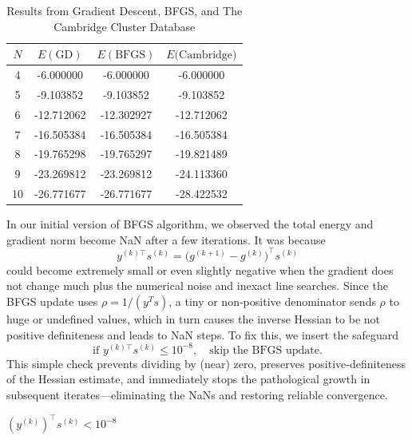 \documentclass[11pt,onecolumn]{article}
\begin{document}
\begin{table}[h]
\centering
\begin{tabular}{|c|c|c|c|}
\hline
\(N\) & \(E(\mathrm{GD})\) & \(E(\mathrm{BFGS})\) & \(E(\mathrm{Cambridge)}\) \\ \hline
4  & -6.000000  & -6.000000  & -6.000000  \\ \hline
5  & -9.103852  & -9.103852  & -9.103852 \\ \hline
6  & -12.712062 & -12.302927 & -12.712062 \\ \hline
7  & -16.505384 & -16.505384 & -16.505384 \\ \hline
8  & -19.765298 & -19.765297 & -19.821489\\ \hline
9  & -23.269812 & -23.269812 & -24.113360\\ \hline
10 & -26.771677 & -26.771677 & -28.422532\\ \hline
\end{tabular}
\caption{Results from Gradient Descent, BFGS, and The Cambridge Cluster Database}
\end{table}

\noindent In our initial version of BFGS algorithm, we observed the total energy and gradient norm become NaN after a few iterations.  It was because  
\[
  y^{(k)\top}s^{(k)} 
  = \bigl(g^{(k+1)}-g^{(k)}\bigr)^\top s^{(k)}
\]
could become extremely small or even slightly negative when the gradient does not change much plus the numerical noise and inexact line searches.  Since the BFGS update uses  
\(\rho = 1/(y^Ts)\), a tiny or non‑positive denominator sends \(\rho\) to huge or undefined values, which in turn causes the inverse Hessian to be not positive definiteness and leads to NaN steps.  To fix this, we insert the safeguard  
\[
  \text{if }y^{(k)\top}s^{(k)} \le 10^{-8}, \quad\text{skip the BFGS update.}
\]
This simple check prevents dividing by (near) zero, preserves positive‑definiteness of the Hessian estimate, and immediately stops the pathological growth in subsequent iterates—eliminating the NaNs and restoring reliable convergence.  


\((y^{(k)})^\top s^{(k)} < 10^{-8}\)
\end{document}
